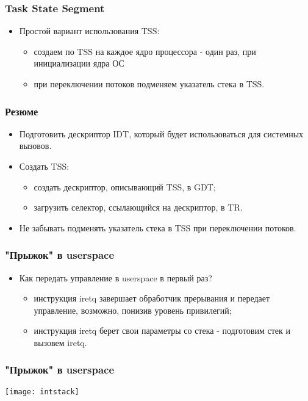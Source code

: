 \begin{frame}
\frametitle{Task State Segment}
\begin{itemize}
    \item<1->Простой вариант использования TSS:
    \begin{itemize}
        \item<2->создаем по TSS на каждое ядро процессора - один раз, при
             инициализации ядра ОС
        \item<3->при переключении потоков подменяем указатель стека в TSS.
    \end{itemize}
\end{itemize}
\end{frame}

\begin{frame}
\frametitle{Резюме}
\begin{itemize}
    \item<1->Подготовить дескриптор IDT, который будет использоваться для
         системных вызовов.
    \item<2->Создать TSS:
    \begin{itemize}
        \item<3->создать дескриптор, описывающий TSS, в GDT;
        \item<4->загрузить селектор, ссылающийся на дескриптор, в TR.
    \end{itemize}
    \item<5->Не забывать подменять указатель стека в TSS при переключении
         потоков.
\end{itemize}
\end{frame}

\begin{frame}
\frametitle{"Прыжок" в userspace}
\begin{itemize}
    \item<1->Как передать управление в userspace в первый раз?
    \begin{itemize}
        \item<2->инструкция iretq завершает обработчик прерывания и
             передает управление, возможно, понизив уровень привилегий;
        \item<3->инструкция iretq берет свои параметры со стека - подготовим
             стек и вызовем iretq.
    \end{itemize}
\end{itemize}
\end{frame}

\begin{frame}
\frametitle{"Прыжок" в userspace}
\texttt{[image: intstack]}
\end{frame}
